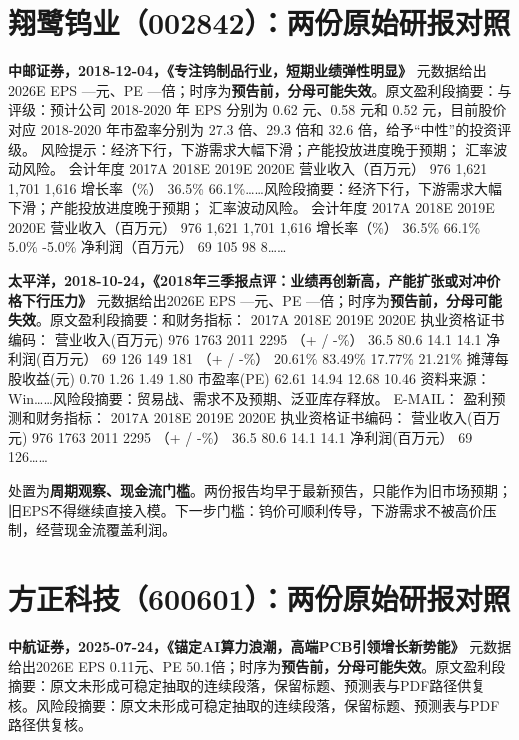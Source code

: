 \section{翔鹭钨业（002842）：两份原始研报对照}

\textbf{中邮证券，2018-12-04，《专注钨制品行业，短期业绩弹性明显》}
元数据给出2026E EPS ---元、PE ---倍；时序为\textbf{预告前，分母可能失效}。原文盈利段摘要：与评级：预计公司 2018-2020 年 EPS 分别为 0.62 元、0.58 元和 0.52 元，目前股价对应 2018-2020 年市盈率分别为 27.3 倍、29.3 倍和 32.6 倍，给予“中性”的投资评级。 风险提示：经济下行，下游需求大幅下滑；产能投放进度晚于预期； 汇率波动风险。 会计年度 2017A 2018E 2019E 2020E 营业收入（百万元） 976 1,621 1,701 1,616 增长率（\%） 36.5\% 66.1\%……风险段摘要：经济下行，下游需求大幅下滑；产能投放进度晚于预期； 汇率波动风险。 会计年度 2017A 2018E 2019E 2020E 营业收入（百万元） 976 1,621 1,701 1,616 增长率（\%） 36.5\% 66.1\% 5.0\% -5.0\% 净利润（百万元） 69 105 98 8……

\textbf{太平洋，2018-10-24，《2018年三季报点评：业绩再创新高，产能扩张或对冲价格下行压力》}
元数据给出2026E EPS ---元、PE ---倍；时序为\textbf{预告前，分母可能失效}。原文盈利段摘要：和财务指标： 2017A 2018E 2019E 2020E 执业资格证书编码： 营业收入(百万元) 976 1763 2011 2295 （+ / -\%） 36.5 80.6 14.1 14.1 净利润(百万元） 69 126 149 181 （+ / -\%） 20.61\% 83.49\% 17.77\% 21.21\% 摊薄每股收益(元) 0.70 1.26 1.49 1.80 市盈率(PE) 62.61 14.94 12.68 10.46 资料来源：Win……风险段摘要：贸易战、需求不及预期、泛亚库存释放。 E-MAIL： 盈利预测和财务指标： 2017A 2018E 2019E 2020E 执业资格证书编码： 营业收入(百万元) 976 1763 2011 2295 （+ / -\%） 36.5 80.6 14.1 14.1 净利润(百万元） 69 126……

\begin{keyinsight}[AStock处理]
处置为\textbf{周期观察、现金流门槛}。两份报告均早于最新预告，只能作为旧市场预期；旧EPS不得继续直接入模。下一步门槛：钨价可顺利传导，下游需求不被高价压制，经营现金流覆盖利润。
\end{keyinsight}

\section{方正科技（600601）：两份原始研报对照}

\textbf{中航证券，2025-07-24，《锚定AI算力浪潮，高端PCB引领增长新势能》}
元数据给出2026E EPS 0.11元、PE 50.1倍；时序为\textbf{预告前，分母可能失效}。原文盈利段摘要：原文未形成可稳定抽取的连续段落，保留标题、预测表与PDF路径供复核。风险段摘要：原文未形成可稳定抽取的连续段落，保留标题、预测表与PDF路径供复核。

